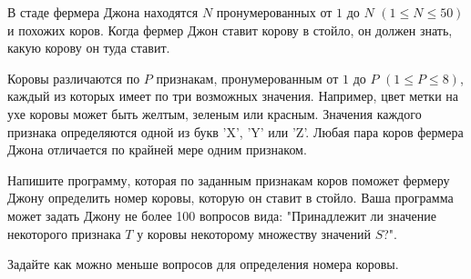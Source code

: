 В стаде фермера Джона находятся $N$ пронумерованных от $1$ до $N$ $(1 \le N \le 50)$ и
похожих коров. Когда фермер Джон ставит корову в стойло, он должен знать,
какую корову он туда ставит. 

Коровы различаются по $P$ признакам, пронумерованным от $1$ до $P$ $(1 \le P \le 8)$,
каждый из которых имеет по три возможных значения. Например, цвет метки на
ухе коровы может быть желтым, зеленым или красным. Значения каждого
признака определяются одной из букв 'X', 'Y' или 'Z'. Любая пара коров фермера
Джона отличается по крайней мере одним признаком.

Напишите программу, которая по заданным признакам коров поможет фермеру
Джону определить номер коровы, которую он ставит в стойло. Ваша программа
может задать Джону не более 100 вопросов вида: "Принадлежит ли значение
некоторого признака $T$ у коровы некоторому множеству значений $S$?".

Задайте как можно меньше вопросов для определения номера коровы. 
